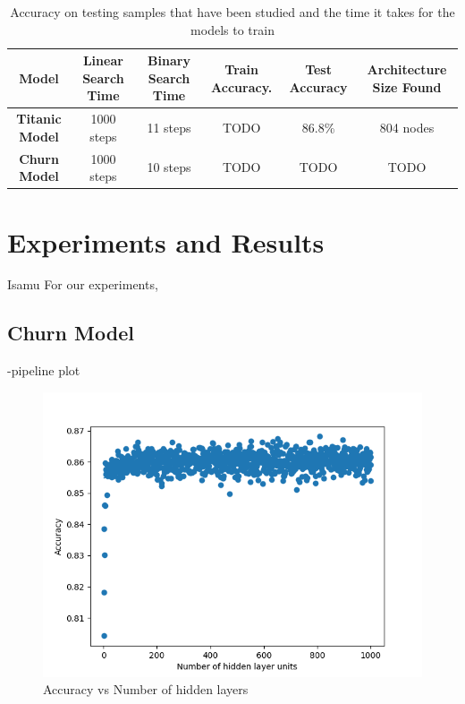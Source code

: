 \documentclass[conference]{IEEEtran}
\begin{document}
\begin{table}[t]
\centering
\caption{Accuracy on testing samples that have been studied and the time it takes for the models to train}
\label{table:cifar}
\begin{tabular}{c|c|c|c|c|c|}
\hline
\multicolumn{1}{|c|}{\textbf{Model}} &
  \textbf{Linear Search Time} & \textbf{Binary Search Time} & \textbf{Train Accuracy.} & \textbf{Test Accuracy} & \textbf{Architecture Size Found} \\ \hline

\multicolumn{1}{|c|}{\textbf{Titanic Model}} & 1000 steps  & 11 steps & TODO  & 86.8\%  & 804 nodes \\ \hline

\multicolumn{1}{|c|}{\textbf{Churn Model}} & 1000 steps & 10 steps & TODO & TODO & TODO \\ \hline
\end{tabular}
\end{table}



\section{Experiments and Results}\label{experimentandresults}
Isamu
For our experiments,
\subsection{Churn Model}
-pipeline plot
\begin{figure}[H]
    \centering
    \includegraphics[width=0.8\linewidth]{figures/1000_iterations_churn.png}
    \setlength{\belowcaptionskip}{-15pt}
    \caption{Accuracy vs Number of hidden layers}
    \label{dnadigest}
\end{figure}
\end{document}
